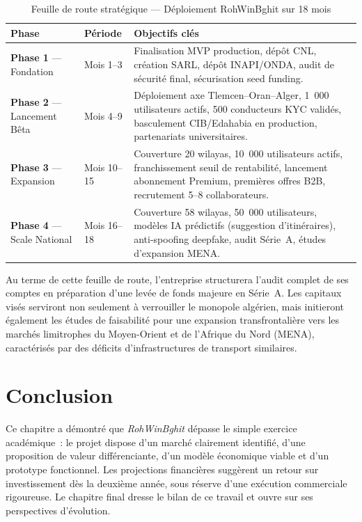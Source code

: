 \documentclass[12pt, a4paper, oneside]{report}
\begin{document}
\begin{table}[H]
\centering
\footnotesize
\begin{tabularx}{\textwidth}{|l|l|X|}
\hline
\rowcolor{rohlight}
\textbf{Phase} & \textbf{Période} & \textbf{Objectifs clés} \\
\hline
\textbf{Phase 1} --- Fondation & Mois 1--3 & Finalisation MVP production, dépôt CNL, création SARL, dépôt INAPI/ONDA, audit de sécurité final, sécurisation seed funding. \\
\hline
\textbf{Phase 2} --- Lancement Bêta & Mois 4--9 & Déploiement axe Tlemcen--Oran--Alger, 1~000 utilisateurs actifs, 500 conducteurs KYC validés, basculement CIB/Edahabia en production, partenariats universitaires. \\
\hline
\textbf{Phase 3} --- Expansion & Mois 10--15 & Couverture 20 wilayas, 10~000 utilisateurs actifs, franchissement seuil de rentabilité, lancement abonnement Premium, premières offres B2B, recrutement 5--8 collaborateurs. \\
\hline
\textbf{Phase 4} --- Scale National & Mois 16--18 & Couverture 58 wilayas, 50~000 utilisateurs, modèles IA prédictifs (suggestion d'itinéraires), anti-spoofing deepfake, audit Série~A, études d'expansion MENA. \\
\hline
\end{tabularx}
  \caption{Feuille de route stratégique --- Déploiement RohWinBghit sur 18 mois}
  \label{tab:roadmap}
\end{table}

Au terme de cette feuille de route, l'entreprise structurera l'audit complet de ses comptes en préparation d'une levée de fonds majeure en Série~A. Les capitaux visés serviront non seulement à verrouiller le monopole algérien, mais initieront également les études de faisabilité pour une expansion transfrontalière vers les marchés limitrophes du Moyen-Orient et de l'Afrique du Nord (MENA), caractérisés par des déficits d'infrastructures de transport similaires.

\section*{Conclusion}

Ce chapitre a démontré que \textit{RohWinBghit} dépasse le simple exercice académique~: le projet dispose d'un marché clairement identifié, d'une proposition de valeur différenciante, d'un modèle économique viable et d'un prototype fonctionnel. Les projections financières suggèrent un retour sur investissement dès la deuxième année, sous réserve d'une exécution commerciale rigoureuse. Le chapitre final dresse le bilan de ce travail et ouvre sur ses perspectives d'évolution.
\end{document}
